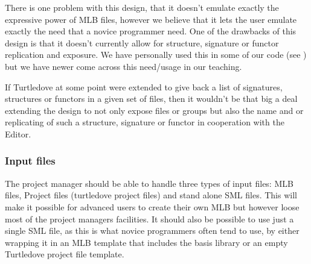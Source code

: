 There is one problem with this design, that it doesn't emulate exactly the
expressive power of MLB files, however we believe that it lets the user emulate
exactly the need that a novice programmer need. One of the drawbacks of this
design is that it doesn't currently allow for structure, signature or functor
replication and exposure. We have personally used this in some of our code (see
) but we have newer come across this need/usage in our
teaching.

If Turtledove at some point were extended to give back a list of
signatures, structures or functors in a given set of files, then it wouldn't be
that big a deal extending the design to not only expose files or groups but also
the name and or replicating of such a structure, signature or functor in
cooperation with the Editor.

\subsubsection{Input files}

The project manager should be able to handle three types of input files: MLB files,
Project files (turtledove project files) and stand alone SML files. This will
make it possible for advanced users to create their own MLB but however loose
most of the project managers facilities. It should also be possible to use just
a single SML file, as this is what novice programmers often tend to use, by either
wrapping it in an MLB template that includes the basis library or an empty Turtledove
project file template. 

